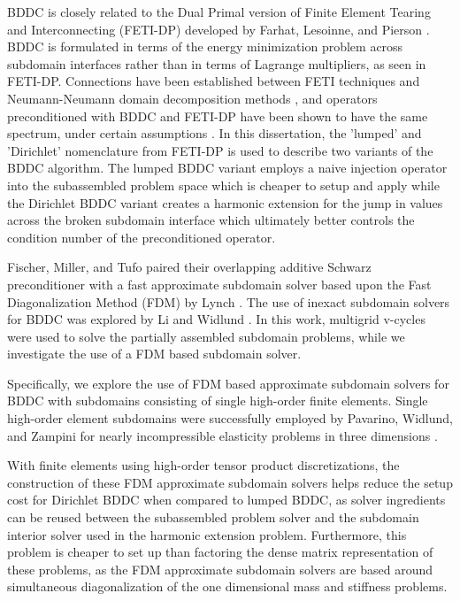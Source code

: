 BDDC is closely related to the Dual Primal version of Finite Element Tearing and Interconnecting (FETI-DP) developed by Farhat, Lesoinne, and Pierson \cite{farhat1991method}.
BDDC is formulated in terms of the energy minimization problem across subdomain interfaces rather than in terms of Lagrange multipliers, as seen in FETI-DP.
Connections have been established between FETI techniques and Neumann-Neumann domain decomposition methods \cite{klawonn2001feti}, and operators preconditioned with BDDC and FETI-DP have been shown to have the same spectrum, under certain assumptions \cite{mandel2007bddc}.
In this dissertation, the 'lumped' and 'Dirichlet' nomenclature from FETI-DP is used to describe two variants of the BDDC algorithm.
The lumped BDDC variant employs a naive injection operator into the subassembled problem space which is cheaper to setup and apply while the Dirichlet BDDC variant creates a harmonic extension for the jump in values across the broken subdomain interface which ultimately better controls the condition number of the preconditioned operator.

Fischer, Miller, and Tufo \cite{fischer2000overlapping} paired their overlapping additive Schwarz preconditioner with a fast approximate subdomain solver based upon the Fast Diagonalization Method (FDM) by Lynch \cite{lynch1964direct}.
The use of inexact subdomain solvers for BDDC was explored by Li and Widlund \cite{li2007use}.
In this work, multigrid v-cycles were used to solve the partially assembled subdomain problems, while we investigate the use of a FDM based subdomain solver.

Specifically, we explore the use of FDM based approximate subdomain solvers for BDDC with subdomains consisting of single high-order finite elements.
Single high-order element subdomains were successfully employed by Pavarino, Widlund, and Zampini for nearly incompressible elasticity problems in three dimensions \cite{pavarino2010bddc}.

With finite elements using high-order tensor product discretizations, the construction of these FDM approximate subdomain solvers helps reduce the setup cost for Dirichlet BDDC when compared to lumped BDDC, as solver ingredients can be reused between the subassembled problem solver and the subdomain interior solver used in the harmonic extension problem.
Furthermore, this problem is cheaper to set up than factoring the dense matrix representation of these problems, as the FDM approximate subdomain solvers are based around simultaneous diagonalization of the one dimensional mass and stiffness problems.

